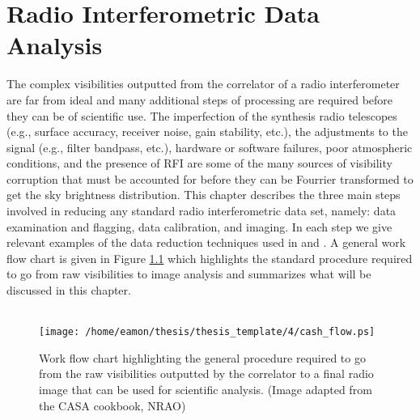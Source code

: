 
\chapter{Radio Interferometric Data Analysis} \label{chap:4}

The complex visibilities outputted from the correlator of a radio interferometer are far from ideal and many additional steps of processing are required before they can be of scientific use. The imperfection of the synthesis radio telescopes (e.g., surface accuracy, receiver noise, gain stability, etc.), the adjustments to the signal (e.g., filter bandpass, etc.), hardware or software failures, poor atmospheric conditions, and the presence of RFI are some of the many sources of visibility corruption that must be accounted for before they can be Fourrier transformed to get the sky brightness distribution. This chapter describes the three main steps involved in reducing any standard radio interferometric data set, namely: data examination and flagging, data calibration, and imaging. In each step we give relevant examples of the data reduction techniques used in \cite{ogorman_2012} and \cite{ogorman_2013}. A general work flow chart is given in Figure \ref{fig:4.1} which highlights the standard procedure required to go from raw visibilities to image analysis and summarizes what will be discussed in this chapter.\\
\\
\begin{figure}[hbt!]
\centering 
          \texttt{[image: /home/eamon/thesis/thesis\_template/4/cash\_flow.ps]}
\caption[Radio interferometry work flow chart.]{Work flow chart highlighting the general procedure required to go from the raw visibilities outputted by the correlator to a final radio image that can be used for scientific analysis. (Image adapted from the CASA cookbook, NRAO)}
\label{fig:4.1}
\end{figure}

